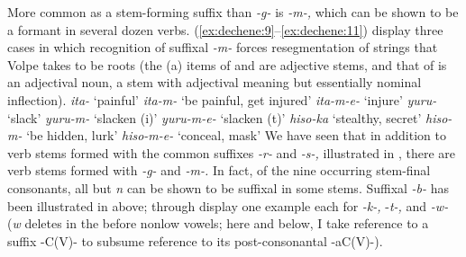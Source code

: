 \documentclass[output=paper,
modfonts
]{LSP/langsci}
\begin{document}
More common as a stem-forming suffix than \textit{-g-} is \textit{-m-,}
which can be shown to be a  formant in several dozen verbs. (\ref{ex:dechene:9}--\ref{ex:dechene:11})
display three cases in which recognition of suffixal \textit{-m-} forces
resegmentation of strings that Volpe takes to be roots (the (a) items of
 and  are adjective stems, and that of  is an adjectival
noun, a stem with adjectival meaning but essentially nominal
inflection).
\ea \label{ex:dechene:9}
	 \ea \label{ex:dechene:9a} \textit{ita-} `painful'
	 \ex \label{ex:dechene:9b} \textit{ita-m-} `be painful, get injured'
	 \ex \label{ex:dechene:9c} \textit{ita-m-e-} `injure'
	\z
\ex \label{ex:dechene:10} 
	 \ea \label{ex:dechene:10a} \textit{yuru-} `slack'
	 \ex \label{ex:dechene:10b} \textit{yuru-m-} `slacken (i)'
	 \ex \label{ex:dechene:10c} \textit{yuru-m-e-} `slacken (t)'
	\z
\ex \label{ex:dechene:11}
	 \ea \label{ex:dechene:11a} \textit{hiso-ka} `stealthy, secret'
	 \ex \label{ex:dechene:11b} \textit{hiso-m-} `be hidden, lurk'
	 \ex \label{ex:dechene:11c} \textit{hiso-m-e-} `conceal, mask'
	\z
\z
We have seen that in addition to verb stems formed with the common
suffixes \textit{-r-} and \textit{-s-,} illustrated in , there are verb
stems formed with \textit{-g-} and \textit{-m-.} In fact, of the nine
occurring stem-final consonants, all but \textit{n} can be shown to be
suffixal in some stems. Suffixal \textit{-b-} has been illustrated in 
above;  through  display one example each for \textit{-k-,}
-\textit{t-,} and \textit{-w-} (\textit{w} deletes in the 
before nonlow vowels; here and below, I take reference to a suffix
-C(V)- to subsume reference to its post-consonantal  -aC(V)-).
\end{document}
